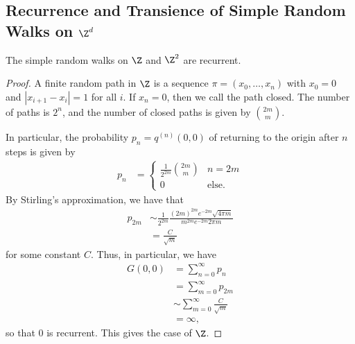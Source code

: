 \documentclass[10pt]{mypackage}
\begin{document}
\subsection{Recurrence and Transience of Simple Random Walks on $\Z^d$}%
\begin{proposition}
  The simple random walks on $\Z$ and $\Z^2$ are recurrent.
\end{proposition}
\begin{proof}
  A finite random path in $\Z$ is a sequence $\pi = \left( x_0,\dots,x_n \right)$ with $x_0 = 0$ and $\left\vert x_{i+1}-x_i \right\vert = 1$ for all $i$. If $x_n = 0$, then we call the path closed. The number of paths is $2^{n}$, and the number of closed paths is given by ${2m\choose m}$.

  In particular, the probability $p_n = q^{(n)}\left( 0,0 \right)$ of returning to the origin after $n$ steps is given by
  \begin{align*}
    p_n &= \begin{cases}
      \frac{1}{2^{2m}} {2m\choose m} & n = 2m\\
      0  & \text{else}.
    \end{cases}
  \end{align*}
  By Stirling's approximation, we have that
  \begin{align*}
    p_{2m} &\sim \frac{1}{2^{2m}} \frac{\left( 2m \right)^{2m}e^{-2m}\sqrt{4\pi m}}{m^{2m}e^{-2m}2\pi m}\\
           &= \frac{C}{\sqrt{m}}
  \end{align*}
  for some constant $C$. Thus, in particular, we have
  \begin{align*}
    G\left( 0,0 \right) &= \sum_{n=0}^{\infty}p_n\\
                        &= \sum_{m=0}^{\infty}p_{2m}\\
                        &\sim \sum_{m=0}^{\infty} \frac{C}{\sqrt{m}}\\
                        &= \infty,
  \end{align*}
  so that $0$ is recurrent. This gives the case of $\Z$.


\end{proof}
\end{document}
